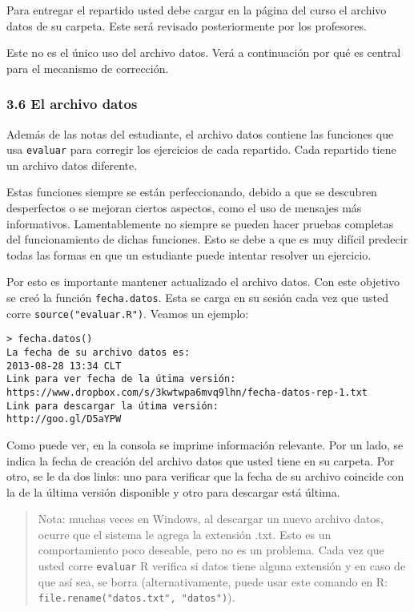 \documentclass[]{article}
\begin{document}
Para entregar el repartido usted debe cargar en la página del curso el
archivo datos de su carpeta. Este será revisado posteriormente por los
profesores.

Este no es el único uso del archivo datos. Verá a continuación por qué
es central para el mecanismo de corrección.

\subsubsection{3.6 El archivo datos}

Además de las notas del estudiante, el archivo datos contiene las
funciones que usa \texttt{evaluar} para corregir los ejercicios de cada
repartido. Cada repartido tiene un archivo datos diferente.

Estas funciones siempre se están perfeccionando, debido a que se
descubren desperfectos o se mejoran ciertos aspectos, como el uso de
mensajes más informativos. Lamentablemente no siempre se pueden hacer
pruebas completas del funcionamiento de dichas funciones. Esto se debe a
que es muy difícil predecir todas las formas en que un estudiante puede
intentar resolver un ejercicio.

Por esto es importante mantener actualizado el archivo datos. Con este
objetivo se creó la función \texttt{fecha.datos}. Esta se carga en su
sesión cada vez que usted corre \texttt{source("evaluar.R")}. Veamos un
ejemplo:

\begin{verbatim}
> fecha.datos()
La fecha de su archivo datos es:
2013-08-28 13:34 CLT 
Link para ver fecha de la útima versión:
https://www.dropbox.com/s/3kwtwpa6mvq9lhn/fecha-datos-rep-1.txt 
Link para descargar la útima versión:
http://goo.gl/D5aYPW 
\end{verbatim}
Como puede ver, en la consola se imprime información relevante. Por un
lado, se indica la fecha de creación del archivo datos que usted tiene
en su carpeta. Por otro, se le da dos links: uno para verificar que la
fecha de su archivo coincide con la de la última versión disponible y
otro para descargar está última.

\begin{quote}
Nota: muchas veces en Windows, al descargar un nuevo archivo datos,
ocurre que el sistema le agrega la extensión .txt. Esto es un
comportamiento poco deseable, pero no es un problema. Cada vez que usted
corre \texttt{evaluar} R verifica si datos tiene alguna extensión y en
caso de que así sea, se borra (alternativamente, puede usar este comando
en R: \texttt{file.rename("datos.txt", "datos")}).

\end{quote}
\end{document}
